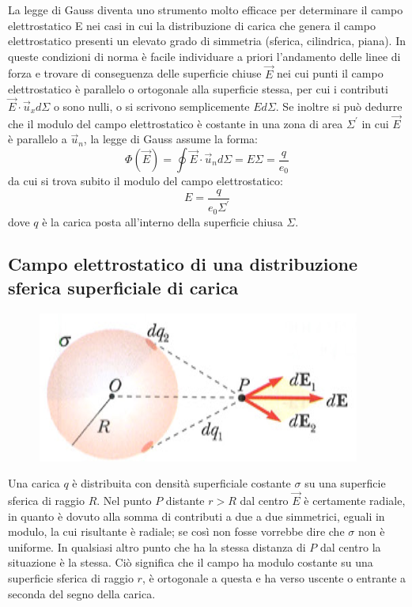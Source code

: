 \documentclass[class=book, crop=false, oneside, 12pt]{standalone}
\begin{document}
La legge di Gauss diventa uno strumento molto efficace per determinare il campo elettrostatico E nei casi in cui la distribuzione di carica che genera il campo elettrostatico presenti un elevato grado di simmetria (sferica, cilindrica, piana).
In queste condizioni di norma è facile individuare a priori l'andamento delle linee di forza e trovare di conseguenza delle superficie chiuse \(\overrightarrow{E}\) nei cui punti il campo elettrostatico è parallelo o ortogonale alla superficie stessa, per cui i contributi \(\overrightarrow{E} \cdot \overrightarrow{u}_x d \Sigma\) o sono nulli, o si scrivono semplicemente \(E d \Sigma\). 
Se inoltre si può dedurre che il modulo del campo elettrostatico è costante in una zona di area \(\Sigma^{\prime}\) in cui \(\overrightarrow{E}\) è parallelo a \(\overrightarrow{u}_n\), la legge di Gauss assume la forma:
\begin{equation*}
    \Phi (\overrightarrow{E}) = \oint \overrightarrow{E} \cdot \overrightarrow{u}_n d \Sigma = E \Sigma = \frac{q}{e_0}
\end{equation*}
da cui si trova subito il modulo del campo elettrostatico: 
\begin{equation*}
    E = \frac{q}{e_0 \Sigma^{\prime}}
\end{equation*}
dove \(q\) è la carica posta all'interno della superficie chiusa \(\Sigma\). 

\subsection{Campo elettrostatico di una distribuzione sferica superficiale di carica}

\begin{figure}[h]
    \includegraphics[scale=0.4]{sfera_superficiale.png}
    \centering
    \caption{}
\end{figure}

Una carica \(q\) è distribuita con densità superficiale costante \(\sigma\) su una superficie sferica di raggio \(R\).  
Nel punto \(P\) distante \(r > R\) dal centro \(\overrightarrow{E}\) è certamente radiale, in quanto è dovuto alla somma di contributi a due a due simmetrici, eguali in modulo, la cui risultante è radiale; se così non fosse vorrebbe dire che \(\sigma\) non è uniforme.  
In qualsiasi altro punto che ha la stessa distanza di \(P\) dal centro la situazione è la stessa. 
Ciò significa che il campo ha modulo costante su una superficie sferica di raggio \(r\), è  ortogonale a questa e ha verso uscente o entrante a seconda del segno della carica.
\end{document}
